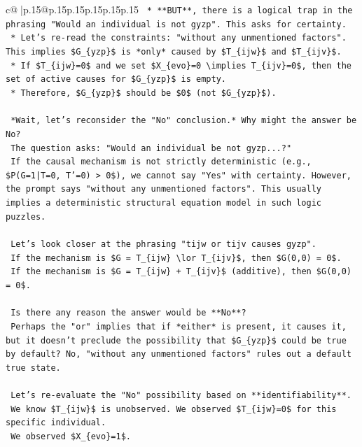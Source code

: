 \documentclass{article}
\begin{document}
{\begin{supertabular}{c@{$\;$}|p{.15\linewidth}@{}p{.15\linewidth}p{.15\linewidth}p{.15\linewidth}p{.15\linewidth}p{.15\linewidth}}
{{{\texttt{        *   **BUT**, there is a logical trap in the phrasing "Would an individual is not gyzp". This asks for certainty.} \\
\texttt{        *   Let's re{-}read the constraints: "without any unmentioned factors". This implies \$G\_\{yzp\}\$ is *only* caused by \$T\_\{ijw\}\$ and \$T\_\{ijv\}\$.} \\
\texttt{        *   If \$T\_\{ijw\}=0\$ and we set \$X\_\{evo\}=0 \textbackslash{}implies T\_\{ijv\}=0\$, then the set of active causes for \$G\_\{yzp\}\$ is empty.} \\
\texttt{        *   Therefore, \$G\_\{yzp\}\$ should be \$0\$ (not \$G\_\{yzp\}\$).} \\
\\ 
\texttt{    *Wait, let's reconsider the "No" conclusion.* Why might the answer be No?} \\
\texttt{    The question asks: "Would an individual be not gyzp...?"} \\
\texttt{    If the causal mechanism is not strictly deterministic (e.g., \$P(G=1|T=0, T'=0) > 0\$), we cannot say "Yes" with certainty. However, the prompt says "without any unmentioned factors". This usually implies a deterministic structural equation model in such logic puzzles.} \\
\\ 
\texttt{    Let's look closer at the phrasing "tijw or tijv causes gyzp".} \\
\texttt{    If the mechanism is \$G = T\_\{ijw\} \textbackslash{}lor T\_\{ijv\}\$, then \$G(0,0) = 0\$.} \\
\texttt{    If the mechanism is \$G = T\_\{ijw\} + T\_\{ijv\}\$ (additive), then \$G(0,0) = 0\$.} \\
\\ 
\texttt{    Is there any reason the answer would be **No**?} \\
\texttt{    Perhaps the "or" implies that if *either* is present, it causes it, but it doesn't preclude the possibility that \$G\_\{yzp\}\$ could be true by default? No, "without any unmentioned factors" rules out a default true state.} \\
\\ 
\texttt{    Let's re{-}evaluate the "No" possibility based on **identifiability**.} \\
\texttt{    We know \$T\_\{ijw\}\$ is unobserved. We observed \$T\_\{ijw\}=0\$ for this specific individual.} \\
\texttt{    We observed \$X\_\{evo\}=1\$.} \\
}}}
\end{supertabular}}
\end{document}
